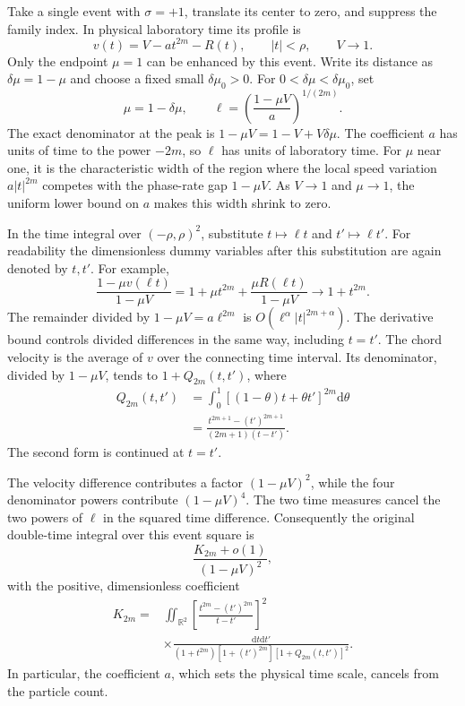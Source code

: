 \documentclass[11pt]{article}
\newcommand{\dd}{\mathrm d}
\newcommand{\R}{\mathbb R}
\begin{document}
Take a single event with $\sigma=+1$, translate its center to zero,
and suppress the family index. In physical laboratory time its
profile is
\begin{equation}
 v(t)=V-a t^{2m}-R(t),\qquad |t|<\rho,\qquad V\to1.
 \label{eq:single-event-profile}
\end{equation}
Only the endpoint $\mu=1$ can be enhanced by this event.
Write its distance as $\delta\mu=1-\mu$ and choose a fixed small
$\delta\mu_0>0$. For $0<\delta\mu<\delta\mu_0$, set
\begin{equation}
 \mu=1-\delta\mu,\qquad
 \ell=\left(\frac{1-\mu V}{a}\right)^{1/(2m)}.
 \label{eq:local-scale}
\end{equation}
The exact denominator at the peak is
$1-\mu V=1-V+V\delta\mu$.
The coefficient $a$ has units of time to the power $-2m$, so
$\ell$ has units of laboratory time. For $\mu$ near one, it is the
characteristic width of the region where the local speed variation
$a|t|^{2m}$ competes with the phase-rate gap $1-\mu V$.
As $V\to1$ and $\mu\to1$, the uniform lower bound on $a$ makes this
width shrink to zero.


In the time integral over $(-\rho,\rho)^2$, substitute
$t\mapsto\ell t$ and $t'\mapsto\ell t'$.
For readability the dimensionless dummy variables after this
substitution are again denoted by $t,t'$. For example,
\begin{equation}
 \frac{1-\mu v(\ell t)}{1-\mu V}
 =1+\mu t^{2m}+\frac{\mu R(\ell t)}{1-\mu V}
 \longrightarrow1+t^{2m}.
 \label{eq:scaled-denominator}
\end{equation}
The remainder divided by $1-\mu V=a\ell^{2m}$ is
$O(\ell^\alpha|t|^{2m+\alpha})$. The derivative bound controls
divided differences in the same way, including $t=t'$.
The chord velocity is the average of $v$ over the connecting time
interval. Its denominator, divided by $1-\mu V$, tends to
$1+Q_{2m}(t,t')$, where
\begin{align}
 Q_{2m}(t,t')
 &=\int_0^1[(1-\theta)t+\theta t']^{2m}\dd\theta\nonumber\\
 &=\frac{t^{2m+1}-(t')^{2m+1}}{(2m+1)(t-t')}.
 \label{eq:local-Q}
\end{align}
The second form is continued at $t=t'$.

The velocity difference contributes a factor $(1-\mu V)^2$,
while the four denominator powers contribute $(1-\mu V)^4$.
The two time measures cancel the two powers of $\ell$ in the
squared time difference. Consequently the original double-time
integral over this event square is
\begin{equation}
 \frac{K_{2m}+o(1)}{(1-\mu V)^2},
 \label{eq:inner-limit}
\end{equation}
with the positive, dimensionless coefficient
\begin{equation}
 \begin{aligned}
 K_{2m}={}&\iint_{\R^2}
 \left[\frac{t^{2m}-(t')^{2m}}{t-t'}\right]^2\\
 &\times\frac{\dd t\dd t'}
 {(1+t^{2m})[1+(t')^{2m}][1+Q_{2m}(t,t')]^2}.
 \end{aligned}
 \label{eq:K}
\end{equation}
In particular, the coefficient $a$, which sets the physical time
scale, cancels from the particle count.
\end{document}
